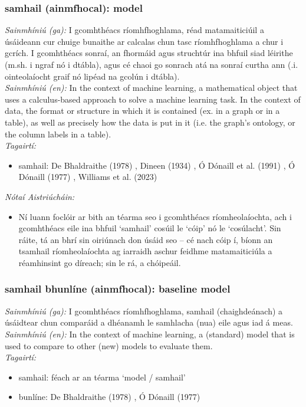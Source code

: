 \subsubsection*{samhail (ainmfhocal): model}
 \noindent \textit{Sainmhíniú (ga):} I gcomhthéacs ríomhfhoghlama, réad matamaiticiúil a úsáideann cur chuige bunaithe ar calcalas chun tasc ríomhfhoghlama a chur i gcrích. I gcomhthéacs sonraí, an fhormáid agus struchtúr ina bhfuil siad léirithe (m.sh. i ngraf nó i dtábla), agus cé chaoi go sonrach atá na sonraí curtha ann (.i. ointeolaíocht graif nó lipéad na gcolún i dtábla).
\\
 \noindent \textit{Sainmhíniú (en):} In the context of machine learning, a mathematical object that uses a calculus-based approach to solve a machine learning task. In the context of data, the format or structure in which it is contained (ex. in a graph or in a table), as well as precisely how the data is put in it (i.e. the graph's ontology, or the column labels in a table).
\\
 \noindent \textit{Tagairtí:}
\begin{itemize}
	\item samhail: De Bhaldraithe (1978) \cite{de-bhaldraithe}, Dineen (1934) \cite{dineen}, Ó Dónaill et al. (1991) \cite{focloir-beag}, Ó Dónaill (1977) \cite{odonaill}, Williams et al. (2023) \cite{storchiste}
\end{itemize}

 \noindent \textit{Nótaí Aistriúcháin:}
\begin{itemize}
	\item Ní luann foclóir ar bith an téarma seo i gcomhthéacs ríomheolaíochta, ach i gcomhthéacs eile ina bhfuil `samhail' cosúil le `cóip' nó le `cosúlacht'. Sin ráite, tá an bhrí sin oiriúnach don úsáid seo -- cé nach cóip í, bíonn an tsamhail ríomheolaíochta ag iarraidh aschur feidhme matamaiticiúla a réamhinsint go díreach; sin le rá, a chóipeáil.
\end{itemize}


\subsubsection*{samhail bhunlíne (ainmfhocal): baseline model}
 \noindent \textit{Sainmhíniú (ga):} I gcomhthéacs ríomhfhoghlama, samhail (chaighdeánach) a úsáidtear chun comparáid a dhéanamh le samhlacha (nua) eile agus iad á meas.
\\
 \noindent \textit{Sainmhíniú (en):} In the context of machine learning, a (standard) model that is used to compare to other (new) models to evaluate them.
\\
 \noindent \textit{Tagairtí:}
\begin{itemize}
	\item samhail: féach ar an téarma `model / samhail'
	\item bunlíne: De Bhaldraithe (1978) \cite{de-bhaldraithe}, Ó Dónaill (1977) \cite{odonaill}
\end{itemize}

